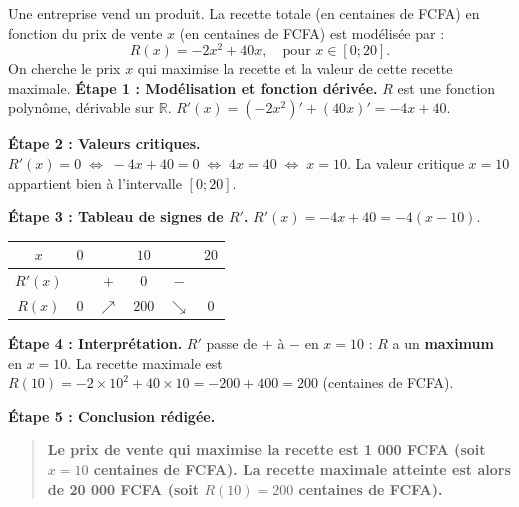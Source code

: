 \documentclass[11pt]{article}
\begin{document}
\begin{exoresolu}
Une entreprise vend un produit. La recette totale (en centaines de FCFA) en fonction du prix de vente $x$ (en centaines de FCFA) est modélisée par :
\[
R(x) = -2x^2 + 40x, \quad \text{pour } x \in [0 ; 20].
\]
On cherche le prix $x$ qui maximise la recette et la valeur de cette recette maximale.
\tcblower
\textbf{Étape 1 : Modélisation et fonction dérivée.}
$R$ est une fonction polynôme, dérivable sur $\mathbb{R}$.
$R'(x) = (-2x^2)' + (40x)' = -4x + 40$.

\textbf{Étape 2 : Valeurs critiques.}
$R'(x) = 0 \;\Leftrightarrow\; -4x + 40 = 0 \;\Leftrightarrow\; 4x = 40 \;\Leftrightarrow\; x = 10$.
La valeur critique $x=10$ appartient bien à l'intervalle $[0 ; 20]$.

\textbf{Étape 3 : Tableau de signes de $R'$.}
$R'(x) = -4x + 40 = -4(x - 10)$.
\begin{center}
\begin{tabular}{|c|ccccc|}\hline
$x$ & $0$ & & $10$ & & $20$ \\ \hline
$R'(x)$ & & $+$ & $0$ & $-$ & \\ \hline
$R(x)$ & $0$ & $\nearrow$ & $200$ & $\searrow$ & $0$ \\ \hline
\end{tabular}
\end{center}

\textbf{Étape 4 : Interprétation.}
$R'$ passe de $+$ à $-$ en $x=10$ : $R$ a un \textbf{maximum} en $x=10$.
La recette maximale est $R(10) = -2 \times 10^2 + 40 \times 10 = -200 + 400 = 200$ (centaines de FCFA).

\textbf{Étape 5 : Conclusion rédigée.}
\begin{quote}
\textbf{Le prix de vente qui maximise la recette est 1 000 FCFA (soit $x=10$ centaines de FCFA). La recette maximale atteinte est alors de 20 000 FCFA (soit $R(10)=200$ centaines de FCFA).}
\end{quote}
\end{exoresolu}
\end{document}

